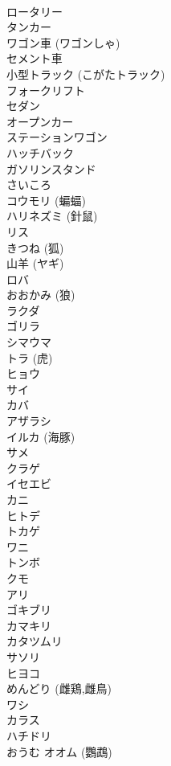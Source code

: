 \documentclass[8pt]{extreport}
\begin{document}
\begin{CJK}{UTF8}{min}
\\	ロータリー 
\\	タンカー
\\	ワゴン車 (ワゴンしゃ)
\\	セメント車 
\\	小型トラック (こがたトラック) 
\\	フォークリフト 
\\	セダン 
\\	オープンカー 
\\	ステーションワゴン 
\\	ハッチバック 
\\	ガソリンスタンド
\\	さいころ 
\\	コウモリ (蝙蝠) 
\\	ハリネズミ (針鼠) 
\\	リス 
\\	きつね (狐)
\\	山羊 (ヤギ) 
\\	ロバ 
\\	おおかみ (狼)
\\	ラクダ 
\\	ゴリラ 
\\	シマウマ 
\\	トラ (虎)
\\	ヒョウ 
\\	サイ 
\\	カバ 
\\	アザラシ 
\\	イルカ (海豚) 
\\	サメ 
\\	クラゲ 
\\	イセエビ 
\\	カニ 
\\	ヒトデ 
\\	トカゲ 
\\	ワニ 
\\	トンボ 
\\	クモ 
\\	アリ
\\	ゴキブリ 
\\	カマキリ 
\\	カタツムリ 
\\	サソリ 
\\	ヒヨコ
\\	めんどり (雌鶏,雌鳥)
\\	ワシ 
\\	カラス 
\\	ハチドリ 
\\	おうむ オオム (鸚鵡) 

\end{CJK}
\end{document}
